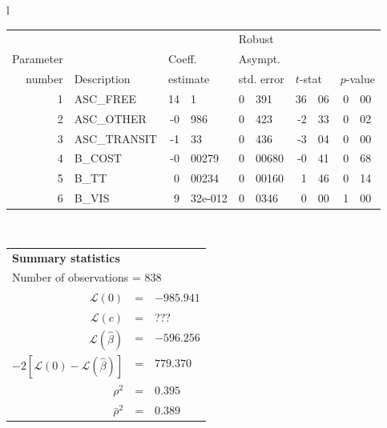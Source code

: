  \begin{tabular}{l}
\begin{tabular}{rlr@{.}lr@{.}lr@{.}lr@{.}l}
         &                       &   \multicolumn{2}{l}{}    & \multicolumn{2}{l}{Robust}  &     \multicolumn{4}{l}{}   \\
Parameter &                       &   \multicolumn{2}{l}{Coeff.}      & \multicolumn{2}{l}{Asympt.}  &     \multicolumn{4}{l}{}   \\
number &  Description                     &   \multicolumn{2}{l}{estimate}      & \multicolumn{2}{l}{std. error}  &   \multicolumn{2}{l}{$t$-stat}  &   \multicolumn{2}{l}{$p$-value}   \\

\hline

1 & ASC\_FREE & 14&1 & 0&391 & 36&06 & 0&00 \\
2 & ASC\_OTHER & -0&986 & 0&423 & -2&33 & 0&02 \\
3 & ASC\_TRANSIT & -1&33 & 0&436 & -3&04 & 0&00 \\
4 & B\_COST & -0&00279 & 0&00680 & -0&41 & 0&68 \\
5 & B\_TT & 0&00234 & 0&00160 & 1&46 & 0&14 \\
6 & B\_VIS & 9&32e-012 & 0&0346 & 0&00 & 1&00 \\
\hline

\end{tabular}
\\
\begin{tabular}{rcl}
\multicolumn{3}{l}{\bf Summary statistics}\\
\multicolumn{3}{l}{ Number of observations = $838$} \\
 $\mathcal{L}(0)$ &=&  $-985.941$ \\
 $\mathcal{L}(c)$ &=& ???\\
 $\mathcal{L}(\hat{\beta})$ &=& $-596.256 $  \\
 $-2[\mathcal{L}(0) -\mathcal{L}(\hat{\beta})]$ &=& $779.370$ \\
    $\rho^2$ &=&   $0.395$ \\
    $\bar{\rho}^2$ &=&    $0.389$ \\
\end{tabular}
\end{tabular}

